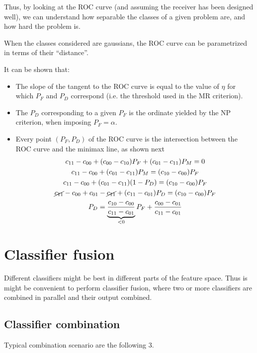 \documentclass[oneside,onecolumn]{report}
\begin{document}
Thus, by looking at the ROC curve (and assuming the receiver has been designed well), we can understand how separable the classes of a given problem are, and how hard the problem is.

When the classes considered are gaussians, the ROC curve can be parametrized in terms of their ``distance''.

It can be shown that:
\begin{itemize}
    \item The slope of the tangent to the ROC curve is equal to the value of $\eta$ for which $P_F$ and $P_D$ correspond (i.e. the threshold used in the MR criterion).
    \item The $P_D$ corresponding to a given $P_F$ is the ordinate yielded by the NP criterion, when imposing $P_F = \alpha$.
    \item Every point $(P_F, P_D)$ of the ROC curve is the intersection between the ROC curve and the minimax line, as shown next
    \begin{gather*}
        c_{11} - c_{00} + (c_{00} - c_{10}) P_F + (c_{01} - c_{11}) P_M = 0 \\
        c_{11} - c_{00} + (c_{01} - c_{11}) P_M = (c_{10} - c_{00}) P_F \\
        c_{11} - c_{00} + (c_{01} - c_{11}) (1 - P_D) = (c_{10} - c_{00}) P_F \\
        \cancel{c_{11}} - c_{00} + c_{01} - \cancel{c_{11}} + (c_{11} - c_{01}) P_D = (c_{10} - c_{00}) P_F \\
        P_D = \underbrace{\frac{c_{10} - c_{00}}{c_{11} - c_{01}}}_{< 0} P_F + \frac{c_{00} - c_{01}}{c_{11} - c_{01}}
    \end{gather*}
\end{itemize}



\section{Classifier fusion}
Different classifiers might be best in different parts of the feature space.
Thus is might be convenient to perform classifier fusion, where two or more classifiers are combined in parallel and their output combined.


\subsection{Classifier combination}
Typical combination scenario are the following 3.
\end{document}
